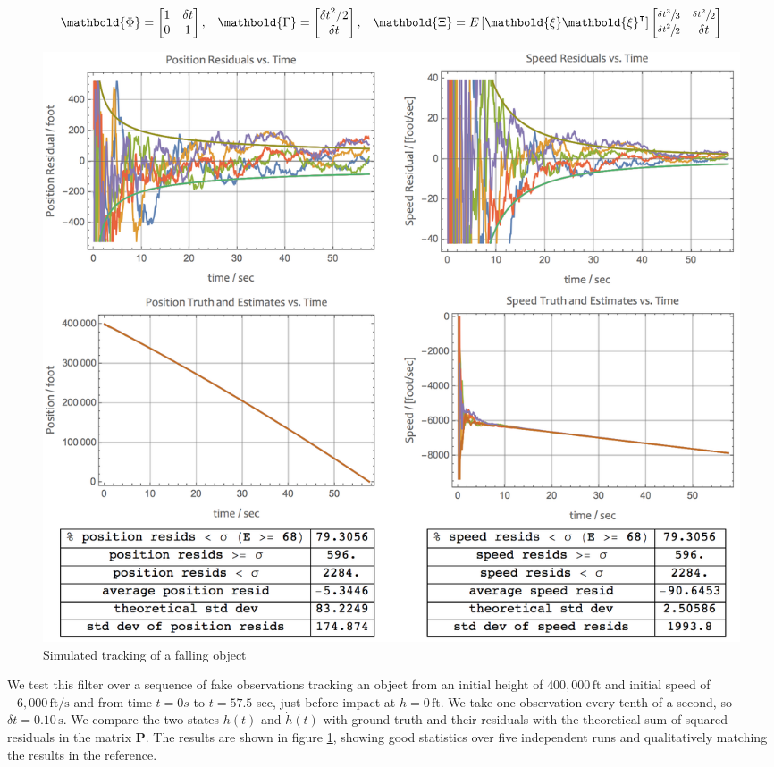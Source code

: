 \documentclass[10pt,oneside,x11names]{article}
\begin{document}
\begin{equation*}
\begin{matrix}
\mathbold{\Phi} =
\begin{bmatrix}
1  & \delta t  \\
0  & 1 
\end{bmatrix}, &
\mathbold{\Gamma} = 
\begin{bmatrix}
{{\delta t}^2}/{2}  \\
\delta t
\end{bmatrix}, &
\mathbold{\Xi} =
E\left[\mathbold{ \xi  }\mathbold{ \xi  }^{ \intercal  }\right]
\begin{bmatrix}
\sfrac { { \delta t }^{ 3 } }{ 3 }  & \sfrac { { \delta t }^{ 2 } }{ 2 }  \\
\sfrac { { \delta t }^{ 2 } }{ 2 }  & \delta t
\end{bmatrix}
\end{matrix}
\end{equation*}

\begin{figure}[htb]
\centering
\includegraphics[width=.9\linewidth]{BigResults.png}
\caption{\label{fig:orgparagraph1}
Simulated tracking of a falling object}
\end{figure}

\noindent We test this filter over a sequence of fake
observations tracking an object from an initial height of \(400,000\,\textrm{ft}\)
and initial speed of \(-6,000\,\textrm{ft}/\textrm{s}\) and from time \(t=\si{0}{s}\)
to \(t=57.5\) sec, just before impact at \(h=0\,\textrm{ft}\). We take one
observation every tenth of a second, so \(\delta t={0.10}\,\textrm{s}\). We compare the
two states \(h(t)\) and \(\dot{h}(t)\) with ground truth and their residuals with
the theoretical sum of squared residuals in the matrix \(\mathbold{P}\). The
results are shown in figure \ref{fig:orgparagraph1}, showing good statistics over five
independent runs and qualitatively matching the results in the reference.
\end{document}

